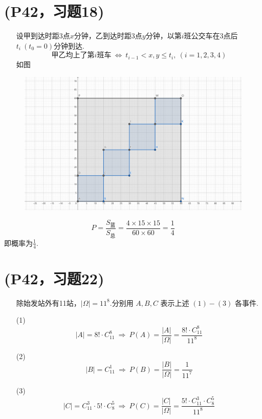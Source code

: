 \documentclass{article}
\begin{document}
\section{(P42，习题18)}
\begin{enumerate}
    \item []设甲到达时距$3$点$x$分钟，乙到达时距$3$点$y$分钟，以第$i$班公交车在$3$点后$t_i\ (t_0=0)$分钟到达.
    \[
        \mbox{甲乙均上了第$i$班车}
        \ \Leftrightarrow\ 
        t_{i-1} < x,y \leq t_{i},\ (i=1,2,3,4)
    \]
    如图
    \item[]
\end{enumerate}
    \begin{figure}[htbp]
        \centering
        \includegraphics*[scale=0.1]{T18.png}
    \end{figure}

    \[
        P=
        \displaystyle{
            \frac{S_{\mbox{蓝}}}{S_{\mbox{总}}}
            =
            \frac{4\times 15 \times 15}{60\times 60}
            =
            \frac{1}{4}
        }
    \]
    即概率为$\frac{1}{4}$.

\section{(P42，习题22)}
\begin{enumerate}
    \item []除始发站外有11站，$|\Omega |= 11^8 $.分别用 $A, B, C$ 表示上述 $(1)-(3)$ 各事件.
    \item [(1)]
    \[
        |A|=8!\cdot C_{11}^{8}
        \ \Rightarrow\ 
        P(A)=
        \displaystyle{
            \frac{|A|}{|\Omega|}
            =\frac{8! \cdot C_{11}^{8} }{11^8}
        }  
    \]
    \item [(2)]
    \[
        |B|=C_{11}^{1}
        \ \Rightarrow\ 
        P(B)=
        \displaystyle{
            \frac{|B|}{|\Omega|}
            =\frac{1}{11^7}
        }  
    \]
    \item [(3)]
    \[
        |C|= C_{11}^{3} \cdot 5! \cdot C_{8}^{5}
        \ \Rightarrow\ 
        P(C)=
        \displaystyle{
            \frac{|C|}{|\Omega|}
            =\frac{5! \cdot C_{11}^{3} \cdot C_{8}^{5}}{11^8}
        }  
    \]
\end{enumerate}
\end{document}
